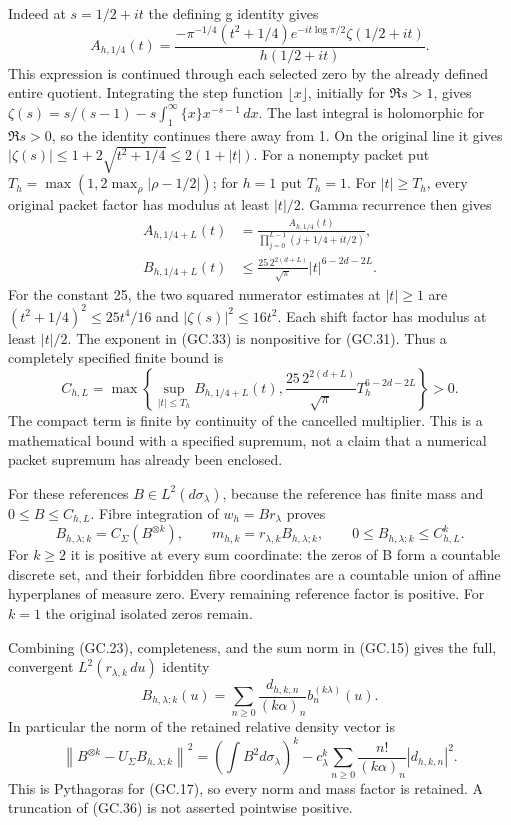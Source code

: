 Indeed at $s=1/2+it$ the defining g identity gives
\[
 A_{h,1/4}(t)=
 \frac{-\pi^{-1/4}(t^2+1/4)e^{-it\log\pi/2}
                  \zeta(1/2+it)}{h(1/2+it)}.                  \tag{GC.32}
\]
This expression is continued through each selected zero by the
already defined entire quotient. Integrating the step function
$\lfloor x\rfloor$, initially for $\Re s>1$, gives
$\zeta(s)=s/(s-1)-s\int_1^\infty\{x\}x^{-s-1}\,dx$.
The last integral is holomorphic for $\Re s>0$, so the identity
continues there away from 1. On the original line it gives
$|\zeta(s)|\le1+2\sqrt{t^2+1/4}\le2(1+|t|)$.
For a nonempty packet put
$T_h=\max(1,2\max_\rho|\rho-1/2|)$; for $h=1$ put $T_h=1$.
For $|t|\ge T_h$, every original packet factor has modulus at
least $|t|/2$. Gamma recurrence then gives
\[
 \begin{split}
 A_{h,1/4+L}(t)&=
   \frac{A_{h,1/4}(t)}{\prod_{j=0}^{L-1}(j+1/4+it/2)},\\
 B_{h,1/4+L}(t)&\le
       \frac{25\,2^{2(d+L)}}{\sqrt\pi}|t|^{6-2d-2L}.
 \end{split}                                                   \tag{GC.33}
\]
For the constant 25, the two squared numerator estimates at $|t|\ge1$
are $(t^2+1/4)^2\le25t^4/16$ and
$|\zeta(s)|^2\le16t^2$. Each shift factor has modulus at least
$|t|/2$. The exponent in (GC.33) is nonpositive for (GC.31).
Thus a completely specified finite bound is
\[
 C_{h,L}=\max\left\{
 \sup_{|t|\le T_h}B_{h,1/4+L}(t),
 \frac{25\,2^{2(d+L)}}{\sqrt\pi}T_h^{6-2d-2L}\right\}>0.
                                                               \tag{GC.34}
\]
The compact term is finite by continuity of the cancelled multiplier.
This is a mathematical bound with a specified supremum, not a claim
that a numerical packet supremum has already been enclosed.

For these references $B\in L^2(d\sigma_\lambda)$, because the
reference has finite mass and $0\le B\le C_{h,L}$. Fibre integration
of $w_h=Br_\lambda$ proves
\[
 B_{h,\lambda;k}=C_\Sigma(B^{\otimes k}),\qquad
 m_{h,k}=r_{\lambda,k}B_{h,\lambda;k},\qquad
 0\le B_{h,\lambda;k}\le C_{h,L}^k.                            \tag{GC.35}
\]
For $k\ge2$ it is positive at every sum coordinate: the zeros of B
form a countable discrete set, and their forbidden fibre coordinates
are a countable union of affine hyperplanes of measure zero. Every
remaining reference factor is positive. For $k=1$ the original
isolated zeros remain.

Combining (GC.23), completeness, and the sum norm in (GC.15) gives
the full, convergent $L^2(r_{\lambda,k}\,du)$ identity
\[
 B_{h,\lambda;k}(u)=\sum_{n\ge0}
                \frac{d_{h,k,n}}{(k\alpha)_n}b_n^{(k\lambda)}(u).
                                                               \tag{GC.36}
\]
In particular the norm of the retained relative density vector is
\[
 \left\|B^{\otimes k}-U_\Sigma B_{h,\lambda;k}\right\|^2
   =\left(\int B^2d\sigma_\lambda\right)^k
      -c_\lambda^k\sum_{n\ge0}
                       \frac{n!}{(k\alpha)_n}|d_{h,k,n}|^2.
                                                               \tag{GC.37}
\]
This is Pythagoras for (GC.17), so every norm and mass factor is
retained. A truncation of (GC.36) is not asserted pointwise positive.

